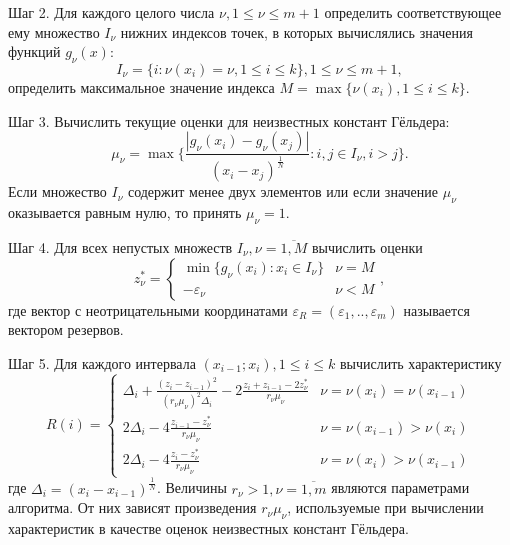 \documentclass{cmi}
\begin{document}
Шаг 2. Для каждого целого числа \(\nu ,1\leqslant \nu \leqslant m+1\) определить соответствующее
ему множество \(I_{\nu }\) нижних индексов точек, в которых вычислялись значения
функций \(g_{\nu }(x)\):
\begin{displaymath}
  I_{\nu }=\{i:\nu (x_{i})=\nu ,1\leqslant i\leqslant k\},1\leq \nu \leqslant m+1,
\end{displaymath}
определить максимальное значение индекса \(M=\max\{\nu (x_{i}),1\leq i\leq k\}\).

Шаг 3. Вычислить текущие оценки для неизвестных констант Гёльдера:
\begin{equation}
  \label{step2}
  \mu _{\nu }=\max\{\frac{|g_{\nu }(x_{i})-g_{\nu }(x_{j})|}{(x_{i}-x_{j})^{\frac{1}{N}}}:i,j\in I_{\nu },i>j\}.
\end{equation}
Если множество \(I_{\nu }\) содержит менее двух элементов или если значение \(\mu _{\nu }\)
оказывается равным нулю, то принять \(\mu _{\nu }=1\).

Шаг 4. Для всех непустых множеств \(I_{\nu },\nu ={\overline {1,M}}\) вычислить оценки
\begin{displaymath}
  z_{\nu }^{*}={\begin{cases}\min\{g_{\nu }(x_{i}):x_{i}\in I_{\nu }\}&\nu =M\\-\varepsilon _{\nu }&\nu <M\end{cases}},
\end{displaymath}
где вектор с неотрицательными координатами \(\varepsilon _{R}=(\varepsilon _{1},..,\varepsilon _{m})\) называется вектором резервов.

Шаг 5. Для каждого интервала \((x_{i-1};x_{i}),1\leqslant i\leqslant k\) вычислить характеристику
\begin{equation}
  \label{step3_1}
  R(i)={\begin{cases}\Delta _{i}+{\frac {(z_{i}-z_{i-1})^{2}}{(r_{\nu }\mu _{\nu })^{2}\Delta _{i}}}-2{\frac {z_{i}+z_{i-1}-2z_{\nu }^{*}}{r_{\nu }\mu _{\nu }}}&\nu =\nu (x_{i})=\nu (x_{i-1})\\2\Delta _{i}-4{\frac {z_{i-1}-z_{\nu }^{*}}{r_{\nu }\mu _{\nu }}}&\nu =\nu (x_{i-1})>\nu (x_{i})\\2\Delta _{i}-4{\frac {z_{i}-z_{\nu }^{*}}{r_{\nu }\mu _{\nu }}}&\nu =\nu (x_{i})>\nu (x_{i-1})\end{cases}}
\end{equation}
где \(\Delta _{i}=(x_{i}-x_{i-1})^{\frac{1}{N}}\). Величины \(r_{\nu }>1,\nu ={\overline {1,m}}\)
являются параметрами алгоритма. От них зависят произведения \(r_{\nu }\mu _{\nu }\),
используемые при вычислении характеристик в качестве оценок неизвестных констант Гёльдера.
\end{document}

